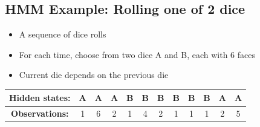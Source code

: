 \documentclass[10pt]{article}
\begin{document}
\subsection*{HMM Example: Rolling one of 2 dice}
\begin{itemize}
	\item A sequence of dice rolls
	\item For each time, choose from two dice A and B, each with 6 faces
	\item Current die depends on the previous die
\end{itemize}
\begin{center}
\begin{tabular}{|c|c|c|c|c|c|c|c|c|c|c|c|}
    \hline
    \textbf{Hidden states:} & A & A & A & B & B & B & B & B & B & A & A \\ \hline
    \textbf{Observations:} & 1 & 6 & 2 & 1 & 4 & 2 & 1 & 1 & 1 & 2 & 5 \\ \hline
\end{tabular}
\end{center}
\end{document}
